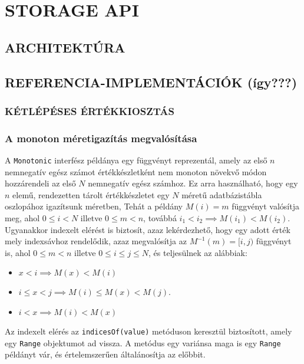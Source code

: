 \documentclass[
    parspace,
    noindent,
    nohyp,
]{elteiktdk}[2023/04/10]
\begin{document}
\chapter{STORAGE API}

\section{ARCHITEKTÚRA}

\section{REFERENCIA-IMPLEMENTÁCIÓK (így???)}

\subsection{KÉTLÉPÉSES ÉRTÉKKIOSZTÁS}

\subsection{A monoton méretigazítás megvalósítása}

A \texttt{Monotonic} interfész példánya egy függvényt reprezentál,
amely az első $n$ nemnegatív egész számot értékkészletként nem monoton növekvő módon hozzárendeli az első $N$ nemnegatív egész számhoz.
Ez arra használható, hogy egy $n$ elemű, rendezetten tárolt értékkészletet egy $N$ méretű adatbázistábla oszlopához igazítsunk méretben,
Tehát a példány $M(i) = m$ függvényt valósítja meg, ahol $0 \leq i < N$ illetve $0 \leq m < n$, továbbá $i_1 < i_2 \implies M(i_1) < M(i_2)$.
Ugyanakkor indexelt elérést is biztosít, azaz lekérdezhető, hogy egy adott érték mely indexsávhoz rendelődik,
azaz megvalósítja az $M^{-1}(m) = [i, j)$ függvényt is, ahol $0 \leq m < n$ illetve $0 \leq i \leq j \leq N$, és teljesülnek az alábbiak:

\begin{itemize}
\item $x < i \implies M(x) < M(i)$
\item $i \leq x < j \implies M(i) \leq M(x) < M(j)$.
\item $i < x \implies M(i) < M(x)$
\end{itemize}

Az indexelt elérés az \texttt{indicesOf(value)} metóduson keresztül biztosított, amely egy \texttt{Range} objektumot ad vissza.
A metódus egy variánsa maga is egy \texttt{Range} példányt vár, és értelemszerűen általánosítja az előbbit.
\end{document}
